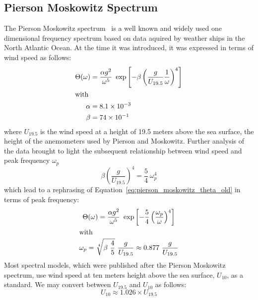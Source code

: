 \subsection{Pierson Moskowitz Spectrum}
\label{sec:pierson_moskowitz}
%
The Pierson Moskowitz spectrum~\cite{article:PiersonMoskowitz1964} is a well 
known and widely used one dimensional frequency spectrum based on data aquired 
by weather ships in the North Atlantic Ocean. At the time it was introduced, 
it was expressed in 
terms of wind speed as follows:
\begin{subequations}
\label{eq:pierson_moskowitz_old}
\begin{align}
 \Theta(\omega) &= \frac{\alpha
g^2}{\omega^5}~\exp\left[-\beta\left(\frac{g}{U_{19.5}}\frac{1}{\omega}
\right)^4\right ] \label{eq:pierson_moskowitz_theta_old}\\
\intertext{with}
\alpha &= 8.1 \times 10^{-3} \label{eq:pierson_moskowitz_alpha} \\
\beta &= 74 \times 10^{-1} \label{eq:pierson_moskowitz_beta}
\end{align}
\end{subequations}
where $U_{19.5}$ is the wind speed at a height of 19.5 meters above the sea
surface, the height of the anemometers used by Pierson and Moskowitz. Further
analysis of the data brought to light the subsequent relationship between wind 
speed and peak frequency $\omega_p$
\begin{equation}
 \beta\left(\frac{g}{U_{19.5}}\right)^4 = \frac{5}{4}~\omega_p^4
\end{equation}
which lead to a rephrasing of Equation~\ref{eq:pierson_moskowitz_theta_old} in 
terms of peak frequency:
\begin{subequations}
\begin{gather}
 \Theta(\omega) = \frac{\alpha
g^2}{\omega^5}~\exp\left[-\frac{5}{4}\left(\frac{\omega_p}{\omega}
\right)^4\right ] \label{eq:pierson_moskowitz_theta}\\
\intertext{with}
\omega_p = \sqrt[4]{\beta~\frac{4}{5}}~\frac{g}{U_{19.5}} \approx
0.877~\frac{g}{U_{19.5}}
\end{gather}
\end{subequations}
Most spectral models, which were published after the Pierson Moskowitz spectrum,
use wind speed at ten meters height above the sea surface, $U_{10}$, as a 
standard. We may convert between $U_{19.5}$ and $U_{10}$ as follows:
\begin{equation}
 U_{10} \approx 1.026\times U_{19.5}
\end{equation}
